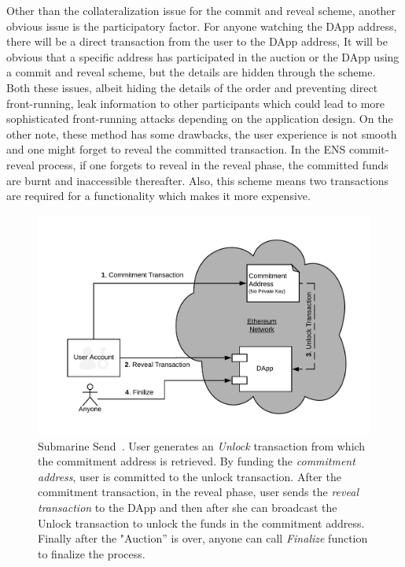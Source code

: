 Other than the collateralization issue for the commit and reveal scheme, another obvious issue is the participatory factor. For anyone watching the DApp address, there will be a direct transaction from the user to the DApp address, It will be obvious that a specific address has participated in the auction or the DApp using a commit and reveal scheme, but the details are hidden through the scheme. Both these issues, albeit hiding the details of the order and preventing direct front-running, leak information to other participants which could lead to more sophisticated front-running attacks depending on the application design. On the other note, these method has some drawbacks, the user experience is not smooth and one might forget to reveal the committed transaction. In the ENS commit-reveal process, if one forgets to reveal in the reveal phase, the committed funds are burnt and inaccessible thereafter. Also, this scheme means two transactions are required for a functionality which makes it more expensive.

\begin{figure}[t]
\centering
\includegraphics[width=0.5\linewidth]{figures/LibSubmarine.png}
\caption{\scriptsize Submarine Send~\cite{libsubmarine}. User generates an \textit{Unlock} transaction from which the commitment address is retrieved. By funding the \textit{commitment address}, user is committed to the unlock transaction. After the commitment transaction, in the reveal phase, user sends the \textit{reveal transaction} to the DApp and then after she can broadcast the Unlock transaction to unlock the funds in the commitment address. Finally after the "Auction'' is over, anyone can call \textit{Finalize} function to finalize the process.  \label{fig:LibSubmarine}}
\end{figure}

